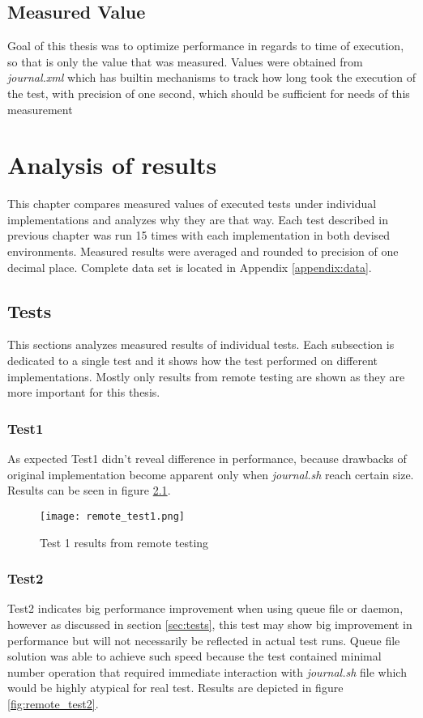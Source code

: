 \section{Measured Value}
Goal of this thesis was to optimize performance in regards to time of execution, so that is only the value that was measured. Values were obtained from \textit{journal.xml} which has builtin mechanisms to track how long took the execution of the test, with precision of one second, which should  be sufficient for needs of this measurement

\chapter{Analysis of results}
\label{results}
This chapter compares measured values of executed tests under individual implementations and analyzes why they are that way.
Each test described in previous chapter was run 15 times with each implementation in both devised environments. Measured results were averaged and rounded to precision of one decimal place. Complete data set is located in Appendix \ref{appendix:data}.

\section{Tests}
This sections analyzes measured results of individual tests. Each subsection is dedicated to a single test and it shows how the test performed on different implementations. Mostly only results from remote testing are shown as they are more important for this thesis.


\subsection{Test1}
As expected Test1 didn't reveal difference in performance, because drawbacks of original implementation become apparent only when \textit{journal.sh} reach certain size. Results can be seen in figure \ref{fig:remote_test1}.

\begin{figure}
  \texttt{[image: remote\_test1.png]}
  \caption{Test 1 results from remote testing}
  \label{fig:remote_test1}
\end{figure}

\subsection{Test2}
Test2 indicates big performance improvement when using queue file or daemon, however as discussed in section \ref{sec:tests}, this test may show big improvement in performance but will not necessarily be reflected in actual test runs. Queue file solution was able to achieve such speed because  the test contained minimal number operation that required immediate interaction with \textit{journal.sh} file which would be highly atypical for real test. Results are depicted in figure \ref{fig:remote_test2}.

